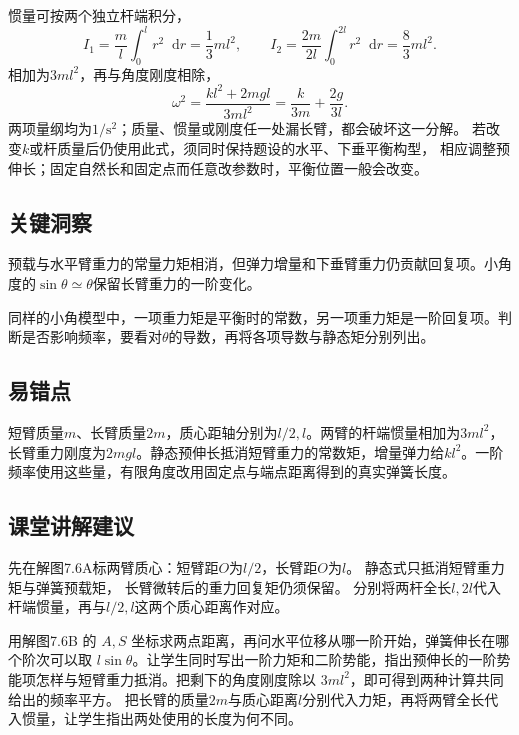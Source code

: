 \documentclass[UTF8,fontset=fandol,a4paper,11pt]{ctexart}
\newcommand{\dd}{\mathop{}\!\mathrm{d}}
\begin{document}
惯量可按两个独立杆端积分，
\[
I_1=\frac ml\int_0^l r^2\dd r=\frac13ml^2,
\qquad I_2=\frac{2m}{2l}\int_0^{2l}r^2\dd r=\frac83ml^2.
\]
相加为$3ml^2$，再与角度刚度相除，
\[
\omega^2=\frac{kl^2+2mgl}{3ml^2}
=\frac{k}{3m}+\frac{2g}{3l}.
\]
两项量纲均为$1/\mathrm s^2$；质量、惯量或刚度任一处漏长臂，都会破坏这一分解。
若改变$k$或杆质量后仍使用此式，须同时保持题设的水平、下垂平衡构型，
相应调整预伸长；固定自然长和固定点而任意改参数时，平衡位置一般会改变。




\subsection*{关键洞察}

预载与水平臂重力的常量力矩相消，但弹力增量和下垂臂重力仍贡献回复项。小角度的$\sin\theta\simeq\theta$保留长臂重力的一阶变化。

同样的小角模型中，一项重力矩是平衡时的常数，另一项重力矩是一阶回复项。判断是否影响频率，要看对$\theta$的导数，再将各项导数与静态矩分别列出。




\subsection*{易错点}

短臂质量$m$、长臂质量$2m$，质心距轴分别为$l/2,l$。两臂的杆端惯量相加为$3ml^2$，长臂重力刚度为$2mgl$。静态预伸长抵消短臂重力的常数矩，增量弹力给$kl^2$。一阶频率使用这些量，有限角度改用固定点与端点距离得到的真实弹簧长度。




\subsection*{课堂讲解建议}

先在解图7.6A标两臂质心：短臂距$O$为$l/2$，长臂距$O$为$l$。
静态式只抵消短臂重力矩与弹簧预载矩，
长臂微转后的重力回复矩仍须保留。
分别将两杆全长$l,2l$代入杆端惯量，再与$l/2,l$这两个质心距离作对应。

用解图7.6B 的 $A,S$ 坐标求两点距离，再问水平位移从哪一阶开始，弹簧伸长在哪个阶次可以取 $l\sin\theta$。让学生同时写出一阶力矩和二阶势能，指出预伸长的一阶势能项怎样与短臂重力抵消。把剩下的角度刚度除以 $3ml^2$，即可得到两种计算共同给出的频率平方。
把长臂的质量$2m$与质心距离$l$分别代入力矩，再将两臂全长代入惯量，让学生指出两处使用的长度为何不同。
\end{document}
